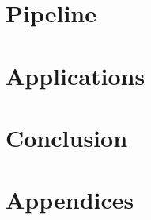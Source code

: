 \documentclass[a4paper, 11pt, twoside]{StyleThese}
\begin{document}
\dominitoc


\frontmatter
%
%
%

\cleardoublepage
\tableofcontents

\cleardoublepage
\listoffigures {} \adjustmtc
\listoftables {} \adjustmtc

\mainmatter

\setcounter{chapter}{0}  %

\part{Pipeline}
\part{Applications}
\part{Conclusion}

\part{Appendices}

\begin{appendix}
    
	
	
	
\end{appendix}

\backmatter

\clearpage



\end{document}
